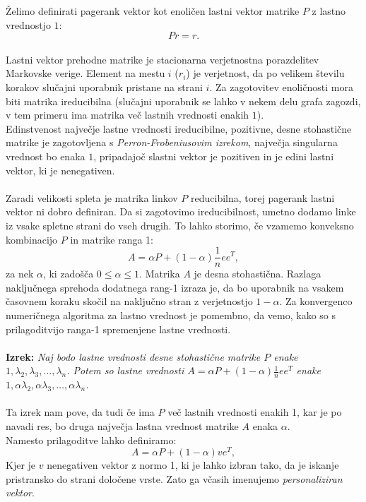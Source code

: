 \documentclass[a4paper]{article}
\begin{document}
Želimo definirati pagerank vektor kot enoličen lastni vektor matrike $P$ z lastno vrednostjo $1$:
$$Pr=r.$$ \\
Lastni vektor prehodne matrike je stacionarna verjetnostna porazdelitev Markovske verige. Element na mestu $i$ ($r_i$) je verjetnost, da po velikem številu korakov slučajni uporabnik pristane na strani $i$. Za zagotovitev enoličnosti mora biti matrika ireducibilna (slučajni uporabnik se lahko v nekem delu grafa zagozdi, v tem primeru ima matrika več lastnih vrednosti enakih $1$). \\ Edinstvenost največje lastne vrednosti ireducibilne, pozitivne, desne stohastične matrike je zagotovljena s \textit{Perron-Frobeniusovim izrekom}, največja singularna vrednost bo enaka $1$, pripadajoč slastni vektor je pozitiven in je edini lastni vektor, ki je nenegativen. \\
\\Zaradi velikosti spleta je matrika linkov $P$ reducibilna, torej pagerank lastni vektor ni dobro definiran. Da si zagotovimo ireducibilnost, umetno dodamo linke iz vsake spletne strani do vseh drugih. To lahko storimo, če vzamemo konveksno kombinacijo $P$ in matrike ranga 1:
$$A=\alpha P + (1-\alpha)\frac{1}{n}ee^T,$$
za nek $\alpha$, ki zadošča $0 \leq \alpha \leq 1$. Matrika $A$ je desna stohastična. Razlaga naključnega sprehoda dodatnega rang-1 izraza je, da bo uporabnik na vsakem časovnem koraku skočil na naključno stran z verjetnostjo $1- \alpha$.
Za konvergenco numeričnega algoritma za lastno vrednost je pomembno, da vemo, kako so s prilagoditvijo ranga-1 spremenjene lastne vrednosti.\\
\\ \textbf{Izrek:} \textit{Naj bodo lastne vrednosti desne stohastične matrike $P$ enake ${1, \lambda_2, \lambda_3, … , \lambda_n}$. Potem so lastne vrednosti $A=\alpha P + (1- \alpha) \frac{1}{n}ee^T$ enake ${1, \alpha \lambda_2, \alpha \lambda_3, … , \alpha \lambda_n}$.}\\
\\
Ta izrek nam pove, da tudi če ima $P$ več lastnih vrednosti enakih 1, kar je po navadi res, bo druga največja lastna vrednost matrike $A$ enaka $\alpha$. \\
Namesto prilagoditve lahko definiramo:
$$A = \alpha P + (1- \alpha)ve^T,$$
Kjer je $v$ nenegativen vektor z normo 1, ki je lahko izbran tako, da je iskanje pristransko do strani določene vrste. Zato ga včasih imenujemo \textit{personaliziran vektor}.
\end{document}
